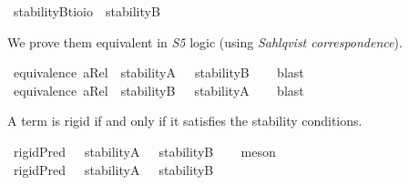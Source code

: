 \begin{isabellebody}
\ stabilityB{\isacharcolon}{\isacharcolon}{\isachardoublequoteopen}{\isacharparenleft}{\isacharprime}t{\isasymRightarrow}io{\isacharparenright}{\isasymRightarrow}io{\isachardoublequoteclose}\ \ {\isachardoublequoteopen}stabilityB\ {\isasymtau}\ {\isasymequiv}\ \isactrlbold {\isasymforall}{\isasymalpha}{\isachardot}\ \isactrlbold {\isasymdiamond}{\isacharparenleft}{\isasymtau}\ {\isasymalpha}{\isacharparenright}\ \isactrlbold {\isasymrightarrow}\ {\isacharparenleft}{\isasymtau}\ {\isasymalpha}{\isacharparenright}{\isachardoublequoteclose}%
\begin{isamarkuptext}%
We prove them equivalent in \emph{S5} logic (using \emph{Sahlqvist correspondence}).%
\end{isamarkuptext}\isamarkuptrue%
\isamarkupfalse%
\ {\isachardoublequoteopen}equivalence\ aRel\ {\isasymLongrightarrow}\ {\isasymlfloor}stabilityA\ {\isacharparenleft}{\isasymtau}{\isacharcolon}{\isacharcolon}{\isasymup}{\isasymlangle}{\isasymzero}{\isasymrangle}{\isacharparenright}{\isasymrfloor}\ {\isasymlongrightarrow}\ {\isasymlfloor}stabilityB\ {\isasymtau}{\isasymrfloor}{\isachardoublequoteclose}%
\ %
%
\isamarkupfalse%
\ blast%
%
%
\ \ \ \ \isanewline
{}\isamarkupfalse%
\ {\isachardoublequoteopen}equivalence\ aRel\ {\isasymLongrightarrow}\ {\isasymlfloor}stabilityB\ {\isacharparenleft}{\isasymtau}{\isacharcolon}{\isacharcolon}{\isasymup}{\isasymlangle}{\isasymzero}{\isasymrangle}{\isacharparenright}{\isasymrfloor}\ {\isasymlongrightarrow}\ {\isasymlfloor}stabilityA\ {\isasymtau}{\isasymrfloor}{\isachardoublequoteclose}%
\ %
%
\isamarkupfalse%
\ blast%
%
%
%
\begin{isamarkuptext}%
A term is rigid if and only if it satisfies the stability conditions.%
\end{isamarkuptext}\isamarkuptrue%
\isamarkupfalse%
\ {\isachardoublequoteopen}{\isasymlfloor}rigidPred\ {\isacharparenleft}{\isasymtau}{\isacharcolon}{\isacharcolon}{\isasymup}{\isasymlangle}{\isasymzero}{\isasymrangle}{\isacharparenright}{\isasymrfloor}\ {\isasymlongleftrightarrow}\ {\isasymlfloor}{\isacharparenleft}stabilityA\ {\isasymtau}\ \isactrlbold {\isasymand}\ stabilityB\ {\isasymtau}{\isacharparenright}{\isasymrfloor}{\isachardoublequoteclose}%
\ %
%
\isamarkupfalse%
\ meson%
%
%
\ \ \ \isanewline
{}\isamarkupfalse%
\ {\isachardoublequoteopen}{\isasymlfloor}rigidPred\ {\isacharparenleft}{\isasymtau}{\isacharcolon}{\isacharcolon}{\isasymup}{\isasymlangle}{\isasymup}{\isasymzero}{\isasymrangle}{\isacharparenright}{\isasymrfloor}\ {\isasymlongleftrightarrow}\ {\isasymlfloor}{\isacharparenleft}stabilityA\ {\isasymtau}\ \isactrlbold {\isasymand}\ stabilityB\ {\isasymtau}{\isacharparenright}{\isasymrfloor}{\isachardoublequoteclose}%

\end{isabellebody}
